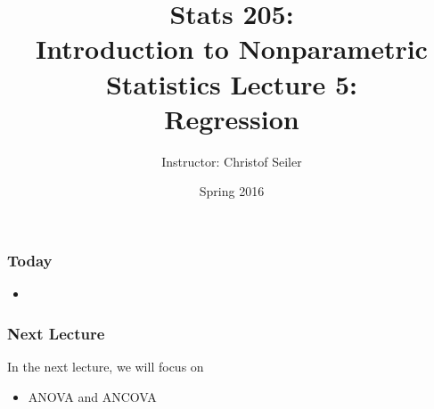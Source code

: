 \documentclass[10pt]{beamer}
\title{\large \bfseries Stats 205: \\ Introduction to Nonparametric Statistics \linebreak \linebreak \linebreak
Lecture 5: \\ Regression}
\author{Instructor: Christof Seiler}
\date{Spring 2016}
\begin{document}
\frame{
\thispagestyle{empty}
\titlepage
}

\begin{frame}
\frametitle{Today}

\begin{itemize}
\item 
\end{itemize}

\end{frame}

\begin{frame}
\frametitle{Next Lecture}

In the next lecture, we will focus on
\begin{itemize}
\item ANOVA and ANCOVA
\end{itemize}

\end{frame}
\end{document}
